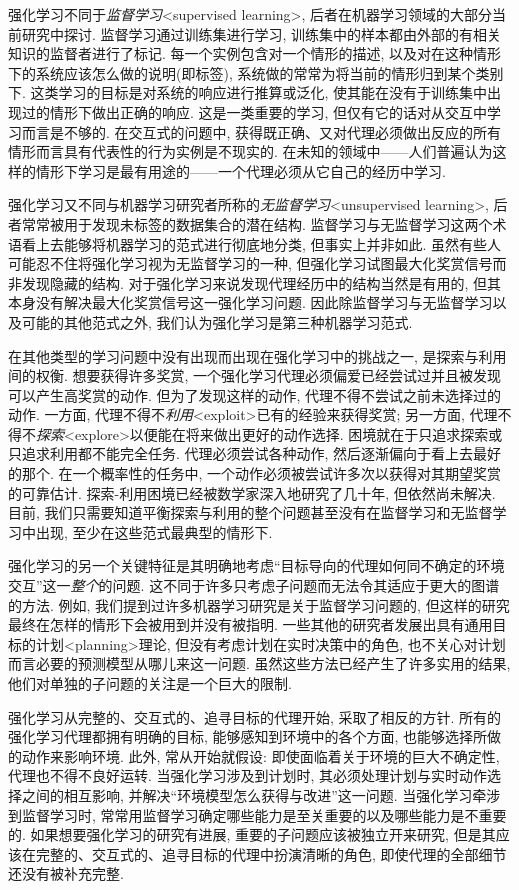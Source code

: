 强化学习不同于\emph{监督学习}<supervised learning>, 后者在机器学习领域的大部分当前研究中探讨. 监督学习通过训练集进行学习, 训练集中的样本都由外部的有相关知识的监督者进行了标记. 每一个实例包含对一个情形的描述, 以及对在这种情形下的系统应该怎么做的说明(即标签), 系统做的常常为将当前的情形归到某个类别下. 这类学习的目标是对系统的响应进行推算或泛化, 使其能在没有于训练集中出现过的情形下做出正确的响应. 这是一类重要的学习, 但仅有它的话对从交互中学习而言是不够的. 在交互式的问题中, 获得既正确、又对代理必须做出反应的所有情形而言具有代表性的行为实例是不现实的. 在未知的领域中——人们普遍认为这样的情形下学习是最有用途的——一个代理必须从它自己的经历中学习.

强化学习又不同与机器学习研究者所称的\emph{无监督学习}<unsupervised learning>, 后者常常被用于发现未标签的数据集合的潜在结构. 监督学习与无监督学习这两个术语看上去能够将机器学习的范式进行彻底地分类, 但事实上并非如此. 虽然有些人可能忍不住将强化学习视为无监督学习的一种, 但强化学习试图最大化奖赏信号而非发现隐藏的结构. 对于强化学习来说发现代理经历中的结构当然是有用的, 但其本身没有解决最大化奖赏信号这一强化学习问题. 因此除监督学习与无监督学习以及可能的其他范式之外, 我们认为强化学习是第三种机器学习范式. 

在其他类型的学习问题中没有出现而出现在强化学习中的挑战之一, 是探索与利用间的权衡. 想要获得许多奖赏, 一个强化学习代理必须偏爱已经尝试过并且被发现可以产生高奖赏的动作. 但为了发现这样的动作, 代理不得不尝试之前未选择过的动作. 一方面, 代理不得不\emph{利用}<exploit>已有的经验来获得奖赏; 另一方面, 代理不得不\emph{探索}<explore>以便能在将来做出更好的动作选择. 困境就在于只追求探索或只追求利用都不能完全任务. 代理必须尝试各种动作, 然后逐渐偏向于看上去最好的那个. 在一个概率性的任务中, 一个动作必须被尝试许多次以获得对其期望奖赏的可靠估计. 探索-利用困境已经被数学家深入地研究了几十年, 但依然尚未解决. 目前, 我们只需要知道平衡探索与利用的整个问题甚至没有在监督学习和无监督学习中出现, 至少在这些范式最典型的情形下.

强化学习的另一个关键特征是其明确地考虑``目标导向的代理如何同不确定的环境交互''这一\emph{整个}的问题. 这不同于许多只考虑子问题而无法令其适应于更大的图谱的方法. 例如, 我们提到过许多机器学习研究是关于监督学习问题的, 但这样的研究最终在怎样的情形下会被用到并没有被指明. 一些其他的研究者发展出具有通用目标的计划<planning>理论, 但没有考虑计划在实时决策中的角色, 也不关心对计划而言必要的预测模型从哪儿来这一问题. 虽然这些方法已经产生了许多实用的结果, 他们对单独的子问题的关注是一个巨大的限制.

强化学习从完整的、交互式的、追寻目标的代理开始, 采取了相反的方针. 所有的强化学习代理都拥有明确的目标, 能够感知到环境中的各个方面, 也能够选择所做的动作来影响环境. 此外, 常从开始就假设: 即使面临着关于环境的巨大不确定性, 代理也不得不良好运转. 当强化学习涉及到计划时, 其必须处理计划与实时动作选择之间的相互影响, 并解决``环境模型怎么获得与改进''这一问题. 当强化学习牵涉到监督学习时, 常常用监督学习确定哪些能力是至关重要的以及哪些能力是不重要的. 如果想要强化学习的研究有进展, 重要的子问题应该被独立开来研究, 但是其应该在完整的、交互式的、追寻目标的代理中扮演清晰的角色, 即使代理的全部细节还没有被补充完整. 

